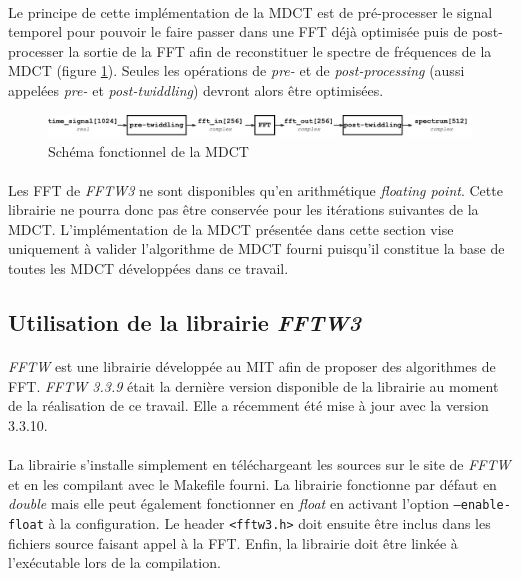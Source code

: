 \documentclass{article}
\begin{document}
    \paragraph{}
    Le principe de cette implémentation de la MDCT est de pré-processer le signal temporel pour pouvoir le faire passer dans une FFT déjà optimisée puis de post-processer la sortie de la FFT afin de reconstituer le spectre de fréquences de la MDCT (figure \ref{fig:schema-mdct}). Seules les opérations de \emph{pre-} et de \emph{post-processing} (aussi appelées \emph{pre-} et \emph{post-twiddling}) devront alors être optimisées.

    \begin{figure}[H]
        \centering
        \includegraphics[width=\linewidth]{./images/schema-mdct.pdf}
        \caption{Schéma fonctionnel de la MDCT}
        \label{fig:schema-mdct}
    \end{figure}

    \paragraph{}
    Les FFT de \emph{FFTW3} ne sont disponibles qu'en arithmétique \emph{floating point}. Cette librairie ne pourra donc pas être conservée pour les itérations suivantes de la MDCT. L'implémentation de la MDCT présentée dans cette section vise uniquement à valider l'algorithme de MDCT fourni puisqu'il constitue la base de toutes les MDCT développées dans ce travail.


    \subsection{Utilisation de la librairie \emph{FFTW3}}

    \paragraph{}
    \emph{FFTW} est une librairie développée au MIT afin de proposer des algorithmes de FFT\cite{FFTW05}. \emph{FFTW 3.3.9} était la dernière version disponible de la librairie au moment de la réalisation de ce travail. Elle a récemment été mise à jour avec la version 3.3.10.

    \paragraph{}
    La librairie s'installe simplement en téléchargeant les sources sur le site de \emph{FFTW}\cite{fftw} et en les compilant avec le Makefile fourni. La librairie fonctionne par défaut en \emph{double} mais elle peut également fonctionner en \emph{float} en activant l'option \texttt{--enable-float} à la configuration. Le header \texttt{<fftw3.h>} doit ensuite être inclus dans les fichiers source faisant appel à la FFT. Enfin, la librairie doit être linkée à l'exécutable lors de la compilation.
\end{document}
